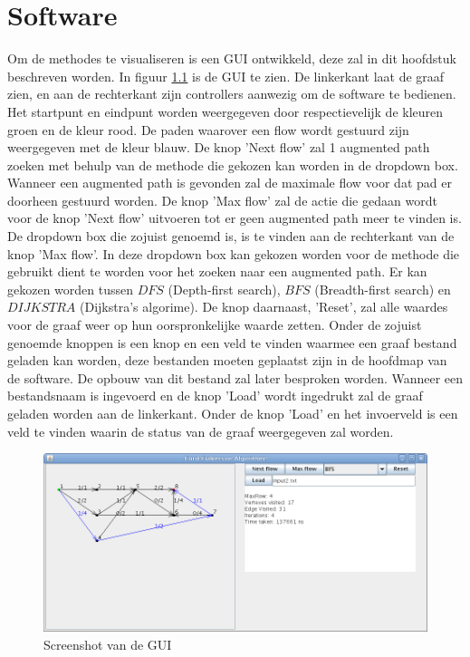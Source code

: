 \chapter{Software}
\label{chap:software}

Om de methodes te visualiseren is een GUI ontwikkeld, deze zal in dit hoofdstuk beschreven worden. In figuur \ref{fig:FFA} is de GUI te zien. De linkerkant laat de graaf zien, en aan de rechterkant zijn controllers aanwezig om de software te bedienen. Het startpunt en eindpunt worden weergegeven door respectievelijk de kleuren groen en de kleur rood. De paden waarover een flow wordt gestuurd zijn weergegeven met de kleur blauw.
De knop 'Next flow' zal 1 augmented path zoeken met behulp van de methode die gekozen kan worden in de dropdown box. Wanneer een augmented path is gevonden zal de maximale flow voor dat pad er doorheen gestuurd worden. De knop 'Max flow' zal de actie die gedaan wordt voor de knop 'Next flow' uitvoeren tot er geen augmented path meer te vinden is. De dropdown box die zojuist genoemd is, is te vinden aan de rechterkant van de knop 'Max flow'. In deze dropdown box kan gekozen worden voor de methode die gebruikt dient te worden voor het zoeken naar een augmented path. Er kan gekozen worden tussen $DFS$ (Depth-first search), $BFS$ (Breadth-first search) en $DIJKSTRA$ (Dijkstra's algorime). De knop daarnaast, 'Reset', zal alle waardes voor de graaf weer op hun oorspronkelijke waarde zetten.
Onder de zojuist genoemde knoppen is een knop en een veld te vinden waarmee een graaf bestand geladen kan worden, deze bestanden moeten geplaatst zijn in de hoofdmap van de software. De opbouw van dit bestand zal later besproken worden. Wanneer een bestandsnaam is ingevoerd en de knop 'Load' wordt ingedrukt zal de graaf geladen worden aan de linkerkant.
Onder de knop 'Load' en het invoerveld is een veld te vinden waarin de status van de graaf weergegeven zal worden.

\begin{figure}[h]
	\includegraphics{software/FFA}
	\centering
	\caption{Screenshot van de GUI}
	\label{fig:FFA}
\end{figure}

